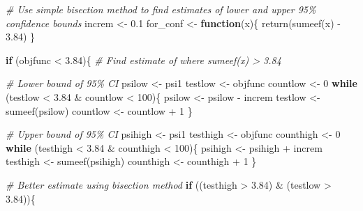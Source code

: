 \documentclass[
  10pt,
]{book}
\newenvironment{Shaded}{\begin{snugshade}}{\end{snugshade}}
\newcommand{\CommentTok}[1]{\textcolor[rgb]{0.56,0.35,0.01}{\textit{#1}}}
\newcommand{\ControlFlowTok}[1]{\textcolor[rgb]{0.13,0.29,0.53}{\textbf{#1}}}
\newcommand{\DecValTok}[1]{\textcolor[rgb]{0.00,0.00,0.81}{#1}}
\newcommand{\FloatTok}[1]{\textcolor[rgb]{0.00,0.00,0.81}{#1}}
\newcommand{\FunctionTok}[1]{\textcolor[rgb]{0.00,0.00,0.00}{#1}}
\newcommand{\NormalTok}[1]{#1}
\newcommand{\OtherTok}[1]{\textcolor[rgb]{0.56,0.35,0.01}{#1}}
\newcommand{\SpecialCharTok}[1]{\textcolor[rgb]{0.00,0.00,0.00}{#1}}
\begin{document}
\begin{Shaded}
\begin{Highlighting}[]
\CommentTok{\# Use simple bisection method to find estimates of lower and upper 95\% confidence bounds}
\NormalTok{increm }\OtherTok{\textless{}{-}} \FloatTok{0.1}
\NormalTok{for\_conf }\OtherTok{\textless{}{-}} \ControlFlowTok{function}\NormalTok{(x)\{}
  \FunctionTok{return}\NormalTok{(}\FunctionTok{sumeef}\NormalTok{(x) }\SpecialCharTok{{-}} \FloatTok{3.84}\NormalTok{)}
\NormalTok{\}}

\ControlFlowTok{if}\NormalTok{ (objfunc }\SpecialCharTok{\textless{}} \FloatTok{3.84}\NormalTok{)\{}
  \CommentTok{\# Find estimate of where sumeef(x) \textgreater{} 3.84}
  
  \CommentTok{\# Lower bound of 95\% CI}
\NormalTok{  psilow }\OtherTok{\textless{}{-}}\NormalTok{ psi1}
\NormalTok{  testlow }\OtherTok{\textless{}{-}}\NormalTok{ objfunc}
\NormalTok{  countlow }\OtherTok{\textless{}{-}} \DecValTok{0}
  \ControlFlowTok{while}\NormalTok{ (testlow }\SpecialCharTok{\textless{}} \FloatTok{3.84} \SpecialCharTok{\&}\NormalTok{ countlow }\SpecialCharTok{\textless{}} \DecValTok{100}\NormalTok{)\{}
\NormalTok{    psilow }\OtherTok{\textless{}{-}}\NormalTok{ psilow }\SpecialCharTok{{-}}\NormalTok{ increm}
\NormalTok{    testlow }\OtherTok{\textless{}{-}} \FunctionTok{sumeef}\NormalTok{(psilow)}
\NormalTok{    countlow }\OtherTok{\textless{}{-}}\NormalTok{ countlow }\SpecialCharTok{+} \DecValTok{1}
\NormalTok{  \}}
  
  \CommentTok{\# Upper bound of 95\% CI}
\NormalTok{  psihigh }\OtherTok{\textless{}{-}}\NormalTok{ psi1}
\NormalTok{  testhigh }\OtherTok{\textless{}{-}}\NormalTok{ objfunc}
\NormalTok{  counthigh }\OtherTok{\textless{}{-}} \DecValTok{0}
  \ControlFlowTok{while}\NormalTok{ (testhigh }\SpecialCharTok{\textless{}} \FloatTok{3.84} \SpecialCharTok{\&}\NormalTok{ counthigh }\SpecialCharTok{\textless{}} \DecValTok{100}\NormalTok{)\{}
\NormalTok{    psihigh }\OtherTok{\textless{}{-}}\NormalTok{ psihigh }\SpecialCharTok{+}\NormalTok{ increm}
\NormalTok{    testhigh }\OtherTok{\textless{}{-}} \FunctionTok{sumeef}\NormalTok{(psihigh)}
\NormalTok{    counthigh }\OtherTok{\textless{}{-}}\NormalTok{ counthigh }\SpecialCharTok{+} \DecValTok{1}
\NormalTok{  \}}
  
  \CommentTok{\# Better estimate using bisection method}
  \ControlFlowTok{if}\NormalTok{ ((testhigh }\SpecialCharTok{\textgreater{}} \FloatTok{3.84}\NormalTok{) }\SpecialCharTok{\&}\NormalTok{ (testlow }\SpecialCharTok{\textgreater{}} \FloatTok{3.84}\NormalTok{))\{}
    

\end{Highlighting}
\end{Shaded}
\end{document}
